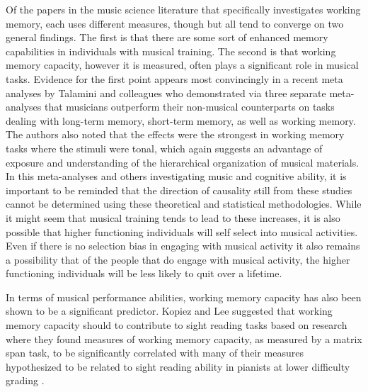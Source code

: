 \documentclass[]{book}
\begin{document}
Of the papers in the music science literature that specifically investigates working memory, each uses different measures, though but all tend to converge on two general findings.
The first is that there are some sort of enhanced memory capabilities in individuals with musical training.
The second is that working memory capacity, however it is measured, often plays a significant role in musical tasks.
Evidence for the first point appears most convincingly in a recent meta analyses by Talamini and colleagues \citep{talaminiMusiciansHaveBetter2017} who demonstrated via three separate meta-analyses that musicians outperform their non-musical counterparts on tasks dealing with long-term memory, short-term memory, as well as working memory.
The authors also noted that the effects were the strongest in working memory tasks where the stimuli were tonal, which again suggests an advantage of exposure and understanding of the hierarchical organization of musical materials.
In this meta-analyses and others investigating music and cognitive ability, it is important to be reminded that the direction of causality still from these studies cannot be determined using these theoretical and statistical methodologies.
While it might seem that musical training tends to lead to these increases, it is also possible that higher functioning individuals will self select into musical activities.
Even if there is no selection bias in engaging with musical activity it also remains a possibility that of the people that do engage with musical activity, the higher functioning individuals will be less likely to quit over a lifetime.

In terms of musical performance abilities, working memory capacity has also been shown to be a significant predictor.
Kopiez and Lee suggested that working memory capacity should to contribute to sight reading tasks based on research where they found measures of working memory capacity, as measured by a matrix span task, to be significantly correlated with many of their measures hypothesized to be related to sight reading ability in pianists at lower difficulty grading \citep{kopiezDynamicModelSkills2006, kopiezGeneralModelSkills2008}.
\end{document}
